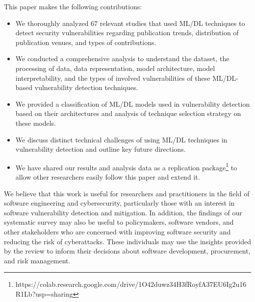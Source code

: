 
This paper makes the following contributions:

\begin{itemize}
    \item We thoroughly analyzed 67 relevant studies that used ML/DL techniques to detect security vulnerabilities regarding publication trends, distribution of publication venues, and types of contributions.
    \item We conducted a comprehensive analysis to understand the dataset, the processing of data, data representation, model architecture, model interpretability, and the types of involved vulnerabilities of these ML/DL-based vulnerability detection techniques.
    \item We provided a classification of ML/DL models used in vulnerability detection based on their architectures and analysis of technique selection strategy on these models.
    \item We discuss distinct technical challenges of using ML/DL techniques in vulnerability detection and outline key future directions. 
    \item We have shared our results and analysis data as a replication package\footnote{https://colab.research.google.com/drive/1O42duwz34H3fRoyfA37EU6Ig2u16R1Lb?usp=sharing} to allow other researchers easily follow this paper and extend it. 
\end{itemize}


{We believe that this work is useful for researchers and practitioners in the field of software engineering and cybersecurity, particularly those with an interest in software vulnerability detection and mitigation. In addition, the findings of our systematic survey may also be useful to policymakers, software vendors, and other stakeholders who are concerned with improving software security and reducing the risk of cyberattacks. These individuals may use the insights provided by the review to inform their decisions about software development, procurement, and risk management.}

